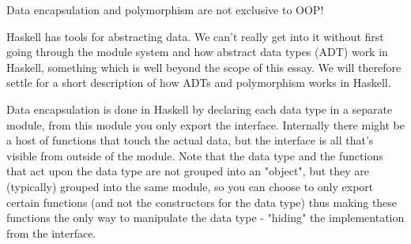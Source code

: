 \documentclass{report}
\begin{document}
Data encapsulation and polymorphism are not exclusive to OOP!

Haskell has tools for abstracting data. We can't really get into it without first going through the module system and how abstract data types (ADT) work in Haskell, something which is well beyond the scope of this essay. We will therefore settle for a short description of how ADTs and polymorphism works in Haskell.

Data encapsulation is done in Haskell by declaring each data type in a separate module, from this module you only export the interface. Internally there might be a host of functions that touch the actual data, but the interface is all that's visible from outside of the module. Note that the data type and the functions that act upon the data type are not grouped into an "object", but they are (typically) grouped into the same module, so you can choose to only export certain functions (and not the constructors for the data type) thus making these functions the only way to manipulate the data type - "hiding" the implementation from the interface.
\end{document}
